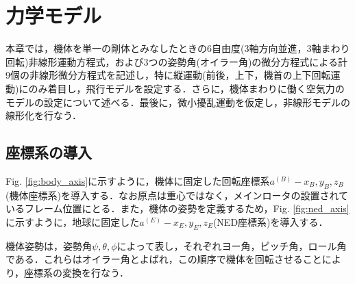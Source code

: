 
\chapter{力学モデル}
\label{model}

本章では，機体を単一の剛体とみなしたときの6自由度(3軸方向並進，3軸まわり回転)非線形運動方程式，および3つの姿勢角(オイラー角)の微分方程式による計9個の非線形微分方程式を記述し，特に縦運動(前後，上下，機首の上下回転運動)にのみ着目し，飛行モデルを設定する．さらに，機体まわりに働く空気力のモデルの設定について述べる．最後に，微小擾乱運動を仮定し，非線形モデルの線形化を行なう．

\section{座標系の導入}
\label{sec:axis}

Fig. \ref{fig:body_axis}に示すように，機体に固定した回転座標系$a^{(B)}-x_B,y_B,z_B$(機体座標系)を導入する．なお原点は重心ではなく，メインロータの設置されているフレーム位置にとる．また，機体の姿勢を定義するため，Fig. \ref{fig:ned_axis}に示すように，地球に固定した$a^{(E)}-x_E,y_E,z_E$(NED座標系)を導入する．

機体姿勢は，姿勢角$\psi,\theta,\phi$によって表し，それぞれヨー角，ピッチ角，ロール角である．これらはオイラー角とよばれ，この順序で機体を回転させることにより，座標系の変換を行なう．

